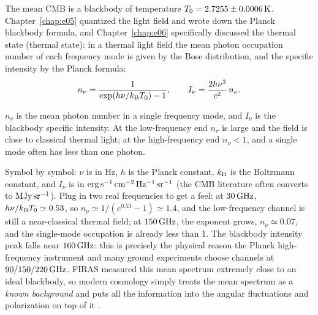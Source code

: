 The mean CMB is a blackbody of temperature \(T_0=2.7255\pm0.0006\,{\rm K}\). Chapter~\ref{chap:e05} quantized the light field and wrote down the Planck blackbody formula, and Chapter~\ref{chap:e06} specifically discussed the thermal state (thermal state): in a thermal light field the mean photon occupation number of each frequency mode is given by the Bose distribution, and the specific intensity by the Planck formula:
\begin{equation}
  n_\nu=\frac{1}{\exp(h\nu/k_{\rm B}T_0)-1},
  \qquad
  I_\nu=\frac{2h\nu^3}{c^2}\,n_\nu .
  \label{eq:e23-planck-spectrum}
\end{equation}
\begin{formulaexplain}
\(n_\nu\) is the mean photon number in a single frequency mode, and \(I_\nu\) is the blackbody specific intensity. At the low-frequency end \(n_\nu\) is large and the field is close to classical thermal light; at the high-frequency end \(n_\nu<1\), and a single mode often has less than one photon.
\end{formulaexplain}
Symbol by symbol: \(\nu\) is in Hz, \(h\) is the Planck constant, \(k_{\rm B}\) is the Boltzmann constant, and \(I_\nu\) is in \({\rm erg\,s^{-1}\,cm^{-2}\,Hz^{-1}\,sr^{-1}}\) (the CMB literature often converts to \({\rm MJy\,sr^{-1}}\)). Plug in two real frequencies to get a feel: at \(30\,{\rm GHz}\), \(h\nu/k_{\rm B}T_0\simeq0.53\), so \(n_\nu\simeq1/(e^{0.53}-1)\simeq1.4\), and the low-frequency channel is still a near-classical thermal field; at \(150\,{\rm GHz}\), the exponent grows, \(n_\nu\simeq0.07\), and the single-mode occupation is already less than 1. The blackbody intensity peak falls near \(160\,{\rm GHz}\): this is precisely the physical reason the Planck high-frequency instrument and many ground experiments choose channels at \(90/150/220\,{\rm GHz}\). FIRAS measured this mean spectrum extremely close to an ideal blackbody, so modern cosmology simply treats the mean spectrum as a \emph{known background} and puts all the information into the angular fluctuations and polarization on top of it \citep{1994ApJ...420..439M,1996ApJ...473..576F,2009ApJ...707..916F}.

